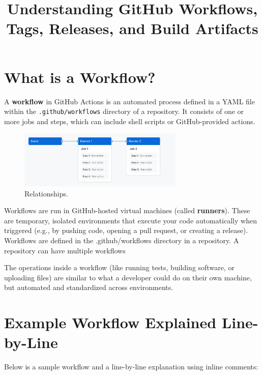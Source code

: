 \documentclass{article}
\title{Understanding GitHub Workflows, Tags, Releases, and Build Artifacts}
\author{}
\date{}
\begin{document}
\maketitle

\section{What is a Workflow?}
A \textbf{workflow} in GitHub Actions is an automated process defined in a YAML file within the \texttt{.github/workflows} directory of a repository. It consists of one or more jobs and steps, which can include shell scripts or GitHub-provided actions.

\begin{figure}[h]
  \centering
  \includegraphics[width=0.7\textwidth]{1.webp}
  \caption{Relationships.}
\end{figure}

Workflows are run in GitHub-hosted virtual machines (called \textbf{runners}). These are temporary, isolated environments that execute your code automatically when triggered (e.g., by pushing code, opening a pull request, or creating a release). Workflows are defined in the .github/workflows directory in a repository. A repository can have multiple workflows

The operations inside a workflow (like running tests, building software, or uploading files) are similar to what a developer could do on their own machine, but automated and standardized across environments.

\section{Example Workflow Explained Line-by-Line}
Below is a sample workflow and a line-by-line explanation using inline comments:
\end{document}
